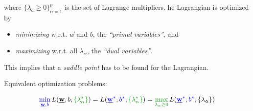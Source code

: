 \begin{frame}


where $\{\lambda_{a} \ge 0\}_{\alpha=1}^{p}$ is the set of Lagrange multipliers. he Lagrangian is optimized by
\begin{itemize}
\item[] \emph{minimizing} w.r.t. $\vec w$ and $b$, the \emph{``primal variables''}, and 
\item[] \emph{maximizing} w.r.t. all $\lambda_{\alpha}$, the \emph{``dual variables''}.
\end{itemize}

\slidesonly{\vspace{5mm}}
This implies that a \emph{saddle point} has to be found for the Lagrangian.
\slidesonly{\vspace{5mm}}

Equivalent optimization problems:

\begin{equation}
		{\color{blue}\min_{\vec w, b}}\, L{(\vec{w}, b, {\color{darkgreen} \{ \lambda_\alpha^*\}})}
		= L{({\color{blue}\vec{w}^*}, {\color{blue}b^*}, {\color{darkgreen} \{ \lambda_\alpha^*\}})}
		= {\color{darkgreen}\max_{ \lambda_\alpha \geq 0}}\, L{({\color{blue}\vec{w}^*}, {\color{blue}b^*}, \{ \lambda_\alpha \})}
\end{equation}

\end{frame}

